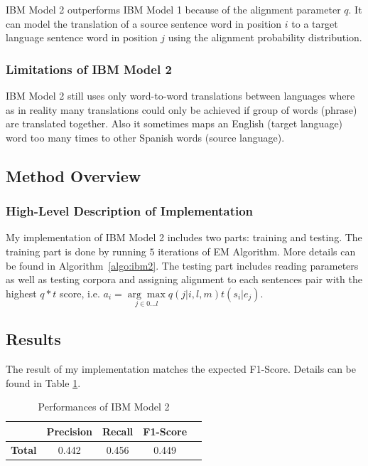 IBM Model 2 outperforms IBM Model 1 because of the alignment parameter $q$. It can model the translation of a source sentence word in position $i$ to a target language sentence word in position $j$ using the alignment probability distribution.

\subsubsection{\textbf{Limitations of IBM Model 2}}

IBM Model 2 still uses only word-to-word translations between languages where as in reality many translations could only be achieved if group of words (phrase) are translated together. Also it sometimes maps an English (target language) word too many times to other Spanish words (source language). 

\subsection{\textbf{Method Overview}}

\subsubsection{\textbf{High-Level Description of Implementation}}

My implementation of IBM Model 2 includes two parts: training and testing. The training part is done by running $5$ iterations of EM Algorithm. More details can be found in Algorithm~\ref{algo:ibm2}. The testing part includes reading parameters as well as testing corpora and assigning alignment to each sentences pair with the highest $q*t$ score, i.e. $a_{i}=\underset{j \in 0 \ldots l}{\arg \max } q(j | i, l, m) t\left(s_{i} | e_{j}\right)$.

\subsection{\textbf{Results}}

The result of my implementation matches the expected F1-Score. Details can be found in Table \ref{tab:ibm2}.

\begin{table}[ht]  %
\centering  %
\caption{Performances of IBM Model 2}
\begin{tabular}{lcccc }
\hline
&    \textbf{Precision} & \textbf{Recall} & \textbf{F1-Score}  \\
\hline
 \textbf{Total} & 0.442 & 0.456 & 0.449 \\
\hline
\end{tabular}
\label{tab:ibm2}
\end{table}

